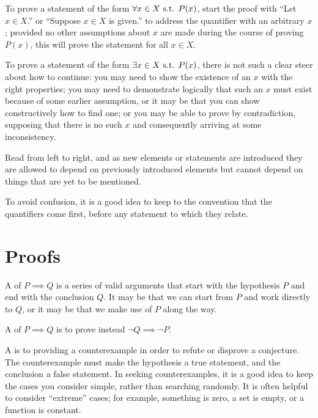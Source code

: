 To prove a statement of the form $\forall x \in X \text{ s.t. } P(x)$, start the proof with ``Let $x \in X$.'' or ``Suppose $x \in X$ is given.'' to address the quantifier with an arbitrary $x$; provided no other assumptions about $x$ are made during the course of proving $P(x)$, this will prove the statement for all $x \in X$. 

To prove a statement of the form $\exists x \in X \text{ s.t. } P(x)$, there is not such a clear steer about how to continue: you may need to show the existence of an $x$ with the right properties; you may need to demonstrate logically that such an $x$ must exist because of some earlier assumption, or it may be that you can show constructively how to find one; or you may be able to prove by contradiction, supposing that there is no such $x$ and consequently arriving at some inconsistency.

\begin{remark}
Read from left to right, and as new elements or statements are introduced they are allowed to depend on previously introduced elements but cannot depend on things that are yet to be mentioned.
\end{remark}

\begin{remark}
To avoid confusion, it is a good idea to keep to the convention that the quantifiers come first, before any statement to which they relate.
\end{remark}

\section{Proofs}
A  of $P \implies Q$ is a series of valid arguments that start with the hypothesis $P$ and end with the conclusion $Q$. It may be that we can start from $P$ and work directly to $Q$, or it may be that we make use of $P$ along the way.

A  of $P \implies Q$ is to prove instead $\lnot Q \implies \lnot P$.

A  is to providing a counterexample in order to refute or disprove a conjecture. The counterexample must make the hypothesis a true statement, and the conclusion a false statement. In seeking counterexamples, it is a good idea to keep the cases you consider simple, rather than searching randomly. It is often helpful to consider ``extreme'' cases; for example, something is zero, a set is empty, or a function is constant.

